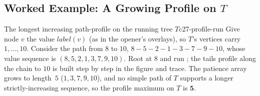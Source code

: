 \subsection{Worked Example: A Growing Profile on $T$}

\begin{example}{The longest increasing path-profile on the running tree $T$}{c27-profile-run}
Give node $v$ the value $\mathit{label}(v)$ (as in the opener's overlays), so $T$'s
vertices carry $1,\dots,10$. Consider the path from $8$ to $10$,
$8\!-\!5\!-\!2\!-\!1\!-\!3\!-\!7\!-\!9\!-\!10$, whose value sequence is
$(8,5,2,1,3,7,9,10)$. Root at $8$ and run ; the tails profile
along the chain to $10$ is built step by step in the figure and trace. The patience
array grows to length~$5$ ($1,3,7,9,10$), and no simple path of $T$ supports a longer
strictly-increasing sequence, so the profile maximum on $T$ is $\mathbf{5}$.
\end{example}


